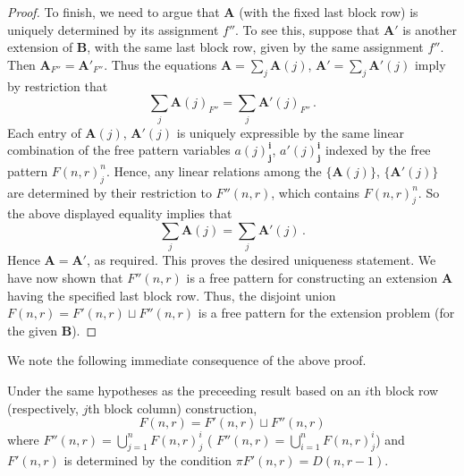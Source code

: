 \documentclass[ALCO,ThmDefs,Unicode,epreuves]{cedram}
\newcommand{\bi}{{\boldsymbol{i}}} %
\newcommand{\bj}{{\boldsymbol{j}}}
\newcommand{\bA}{\mathbf{A}}
\newcommand{\bB}{\mathbf{B}}
\begin{document}
\begin{proof}
To finish, we need to argue that $\bA$ (with the fixed last block row)
is uniquely determined by its assignment $f''$. To see this, suppose
that $\bA'$ is another extension of $\bB$, with the same last block
row, given by the same assignment $f''$. Then $\bA_{F''} =
\bA'_{F''}$. Thus the equations $\bA = \sum_j \bA(j)$, $\bA' = \sum_j
\bA'(j)$ imply by restriction that
\[
\textstyle \sum _j \bA(j)_{F''} = \sum_j \bA'(j)_{F''} \, .
\]
Each entry of $\bA(j)$, $\bA'(j)$ is uniquely expressible by the same
linear combination of the free pattern variables $a(j)^\bi_\bj$,
$a'(j)^\bi_\bj$ indexed by the free pattern $F(n,r)^n_j$. Hence, any
linear relations among the $\{\bA(j)\}$, $\{\bA'(j)\}$ are determined
by their restriction to $F''(n,r)$, which contains $F(n,r)^n_j$. So
the above displayed equality implies that
\[
\textstyle \sum _j \bA(j) = \sum_j \bA'(j) \, .
\]
Hence $\bA = \bA'$, as required. This proves the desired uniqueness
statement. We have now shown that $F''(n,r)$ is a free pattern for
constructing an extension $\bA$ having the specified last block
row. Thus, the disjoint union $F(n,r) = F'(n,r) \sqcup F''(n,r)$ is a
free pattern for the extension problem (for the given $\bB$).
\end{proof}

We note the following immediate consequence of the above proof.

\begin{coro}
 Under the same hypotheses as the preceeding result based on an $i$th
 block row \textup{(}respectively, $j$th block column\textup{)}
 construction,
 \[
 F(n,r) = F'(n,r) \sqcup F''(n,r)
 \]
 where $F''(n,r) = \bigcup_{j=1}^n F(n,r)^i_j$ \textup{(}\resp
 $F''(n,r) = \bigcup_{i=1}^n F(n,r)^i_j$\textup{)} and $F'(n,r)$ is
 determined by the condition $\pi F'(n,r) = D(n,r-1)$.
\end{coro}
\end{document}
